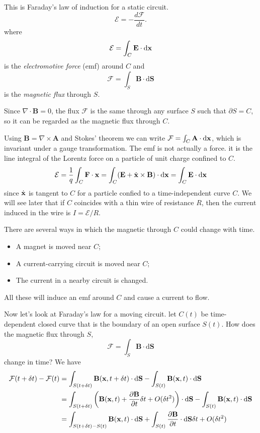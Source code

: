 \documentclass{article}
\begin{document}
This is Faraday's law of induction for a static circuit.
\[
	\mathcal E = - \frac{d\mathcal F}{dt}.
\]
where
\[
  \mathcal E = \int_C \mathbf E\cdot\mathrm d\mathbf{x}
\]
is the \textit{electromotive force} (emf) around $ C $ and
\[
  \mathcal F = \int_S \mathbf B\cdot\mathrm d\mathbf S
\]
is the \textit{magnetic flux} through $ S $.\par
Since $ \nabla\cdot\mathbf B = 0 $, the flux $ \mathcal F $ is the same through any surface $ S $ such that $ \partial S=C $, so it can be regarded as the magnetic flux through $ C $.
\par
Using $ \mathbf B = \nabla\times \mathbf A $ and Stokes' theorem we can write $ \mathcal F = \int_C\mathbf A\cdot\mathrm d \mathbf{x} $, which is invariant under a gauge transformation. The emf is not actually a force. it is the line integral of the Lorentz force on a particle of unit charge confined to $ C $.
\[
	\mathcal E = \frac 1q \int_C\mathbf F \cdot\mathrm {\mathbf{x}} = \int_C(\mathbf E + \dot{\mathbf{x}} \times \mathbf B) \cdot\mathrm d\mathbf{x} = \int_C \mathbf E \cdot\mathrm d\mathbf{x}
\]
since $ \dot{\mathbf{x}} $ is tangent to $ C $ for a particle confied to a time-independent curve $ C $. We will see later that if $ C $ coincides with a thin wire of resistance $ R $, then the current induced in the wire is $ I = \mathcal E /R $.
\par
There are several ways in which the magnetic through $ C $ could change with time.
\begin{itemize}
	\item A magnet is moved near $ C $;
	\item A current-carrying circuit is moved near $ C $;
	\item The current in a nearby circuit is changed.
\end{itemize}
All these will induce an emf around $ C $ and cause a current to flow.
\par
Now let's look at Faraday's law for a moving circuit. let $ C(t) $ be time-dependent closed curve that is the boundary of an open surface $ S(t) $. How does the magnetic flux through $ S $,
\[
  \mathcal F = \int_S \mathbf B \cdot\mathrm d\mathbf S
\]
change in time? We have 
\begin{align*}
	\mathcal F(t+\delta t) - \mathcal F(t) &= \int_{S(t+\delta t)} \mathbf B(\mathbf{x},t+\delta t) \cdot\mathrm d\mathbf S - \int_{S(t)} \mathbf B(\mathbf{x},t)\cdot\mathrm d\mathbf S\\
					       &= \int_{S(t+\delta t)}\left(\mathbf B(\mathbf{x},t)+\frac{\partial \mathbf B}{\partial t}\delta t +O(\delta t^2)\right)\cdot\mathrm d\mathbf S - \int_{S(t)}\mathbf B(\mathbf{x},t)\cdot\mathrm d\mathbf S\\
					       &= \int_{S(t+\delta t)-S(t)}\mathbf B(\mathbf{x},t)\cdot\mathrm d\mathbf S + \int_{S(t)} \frac{\partial \mathbf B}{\partial t}\cdot\mathrm d\mathbf S \delta t + O(\delta t^2)
\end{align*}
\end{document}
